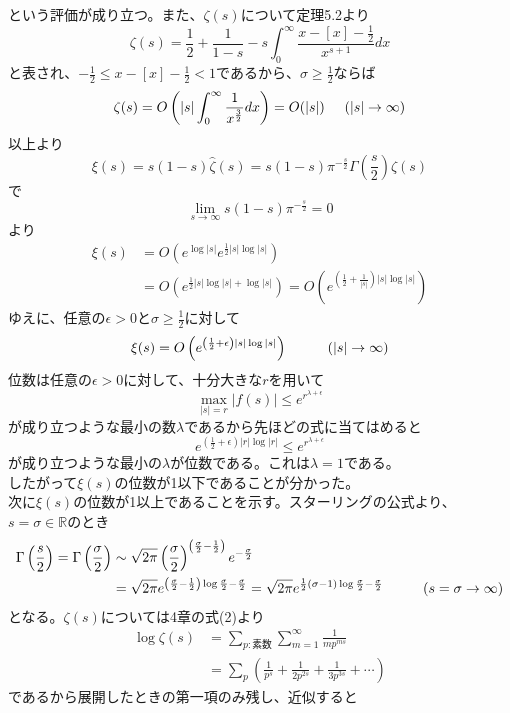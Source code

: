 \documentclass{jsarticle}
\begin{document}
という評価が成り立つ。また、\(\zeta(s)\)について定理5.2より
\[\zeta(s)=\frac{1}{2}+\frac{1}{1-s}-s\int_{0}^{\infty}\frac{x-[x]-\frac{1}{2}}{x^{s+1}}dx\]
と表され、\(-\frac{1}{2}\leq x-[x]-\frac{1}{2}<1\)であるから、\(\sigma\geq\frac{1}{2}\)ならば
\[\zeta(s)=O\left(|s|\int_{0}^{\infty}\frac{1}{x^{\frac{3}{2}}}dx\right)=O(|s|)\hspace{5mm}(|s|\to\infty)\]
以上より
\[\xi(s)=s(1-s)\hat{\zeta}(s)=s(1-s)\pi^{-\frac{s}{2}}\Gamma\left(\frac{s}{2}\right)\zeta(s)\]
で
\[\lim_{s\to\infty}s(1-s)\pi^{-\frac{s}{2}}=0\]
より
\begin{align*}
\xi(s)&=O\left(e^{\log|s|}e^{\frac{1}{2}|s|\log|s|}\right)\\
&=O\left(e^{\frac{1}{2}|s|\log|s|+\log|s|}\right)=O\left(e^{\left(\frac{1}{2}+\frac{1}{|s|}\right)|s|\log|s|}\right)
\end{align*}
ゆえに、任意の\(\epsilon>0\)と\(\sigma\geq\frac{1}{2}\)に対して
\[\xi(s)=O\left(e^{\left(\frac{1}{2}+\epsilon\right)|s|\log|s|}\right)\hspace{10mm}(|s|\to\infty)\]
位数は任意の\(\epsilon>0\)に対して、十分大きな\(r\)を用いて
\[\max_{|s|=r}|f(s)|\leq e^{r^{\lambda+\epsilon}}\]
が成り立つような最小の数\(\lambda\)であるから先ほどの式に当てはめると
\[e^{\left(\frac{1}{2}+\epsilon\right)|r|\log|r|}\leq e^{r^{\lambda+\epsilon}}\]
が成り立つような最小の\(\lambda\)が位数である。これは\(\lambda=1\)である。\\
したがって\(\xi(s)\)の位数が1以下であることが分かった。\\
次に\(\xi(s)\)の位数が1以上であることを示す。スターリングの公式より、\(s=\sigma\in\mathbb{R}\)のとき
\begin{align*}
\Gamma\left(\frac{s}{2}\right)=\Gamma\left(\frac{\sigma}{2}\right)&\sim\sqrt{2\pi}\left(\frac{\sigma}{2}\right)^{\left(\frac{\sigma}{2}-\frac{1}{2}\right)}e^{-\frac{\sigma}{2}}\\
&=\sqrt{2\pi}e^{\left(\frac{\sigma}{2}-\frac{1}{2}\right)\log\frac{\sigma}{2}-\frac{\sigma}{2}}=\sqrt{2\pi}e^{\frac{1}{2}\left(\sigma-1\right)\log\frac{\sigma}{2}-\frac{\sigma}{2}}\hspace{10mm}(s=\sigma\to\infty)
\end{align*}
となる。\(\zeta(s)\)については4章の式(2)より
\begin{align*}
\log\zeta(s)&=\sum_{p:素数}\sum_{m=1}^{\infty}\frac{1}{mp^{ms}}\\
&=\sum_{p}\left(\frac{1}{p^s}+\frac{1}{2p^{2s}}+\frac{1}{3p^{3s}}+\cdots\right)
\end{align*}
であるから展開したときの第一項のみ残し、近似すると
\end{document}
